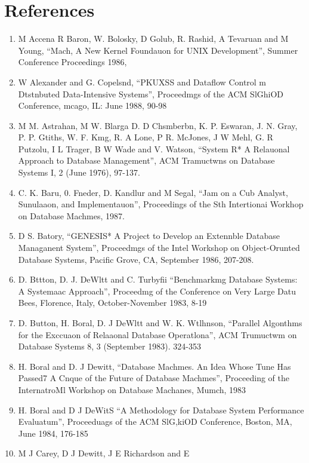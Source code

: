 \documentclass[a4paper,11pt,notitlepage,twoside,openright]{article}
\begin{document}
\section*{References}

\begin{enumerate}
  \item
  M Accena R Baron, W. Bolosky, D Golub, R.
  Rashid, A Tevaruan and M Young, ``Mach, A New
  Kernel Foundauon for UNIX Development'', Summer
  Conference Proceedings 1986,
  \item
  W Alexander and G. Copelsnd, “PKUXSS and
  Dataflow Control m Dtstnbuted Data-Intensive
  Systems”, Proceedmgs of the ACM SlGhiOD
  Conference, mcago, IL: June 1988, 90-98
  \item
  M M. Astrahan, M W. Blarga D. D Chsmberbn,
  K. P. Eswaran, J. N. Gray, P. P. Gtiths, W. F.
  Kmg, R. A Lone, P R. McJones, J W Mehl, G.
  R Putzolu, I L Trager, B W Wade and V.
  Watson, “System R* A Relauonal Approach to
  Database Management”, ACM Tramuctwns on
  Database Systems I, 2 (June 1976), 97-137.
  \item
  C. K. Baru, 0. Fneder, D. Kandlur and M Segal,
  “Jam on a Cub Analyst, Sunulaaon, and
  Implementauon”, Proceedings of the Sth Intertionai
  Workhop on Database Machmes, 1987.
  \item
  D S. Batory, “GENESIS* A Project to Develop an
  Extennble Database Managanent System”,
  Proceedmgs of the Intel Workshop on Object-Orunted
  Database Systems, Pacific Grove, CA, September
  1986, 207-208.
  \item
  D. Bttton, D. J. DeWltt and C. Turbyfii
  “Benchmarkmg Database Systems: A Systemaac
  Approach”, Proceedmg of the Conference on Very
  Large Datu Bees, Florence, Italy, October-November
  1983, 8-19
  \item
  D. Button, H. Boral, D. J DeWltt and W. K.
  Wtlhnson, “Parallel Algonthms for the Exccuaon of
  Relaaonal Database Operatlona”, ACM Trumuctwm
  on Database Systems 8, 3 (September 1983). 324-353
  \item
  H. Boral and D. J Dewitt, “Database Machmes. An
  Idea Whose Tune Has Passed7 A Cnque of the
  Future of Database Machmes”, Proceeding of the
  InternatroMl Workshop on Database Machanes,
  Mumch, 1983
  \item
  H. Boral and D J DeWitS “A Methodology for
  Database System Performance Evaluatum”,
  Proceeduags of the ACM SlG,kiOD Conference,
  Boston, MA, June 1984, 176-185
  \item
  M J Carey, D J Dewitt, J E Richardson and E

\end{enumerate}
\end{document}
